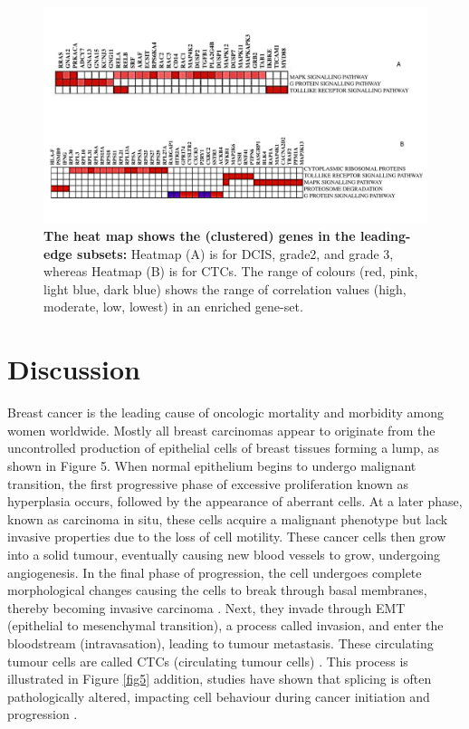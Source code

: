 \documentclass[fleqn,10pt,lineno]{wlpeerj}
\begin{document}
\begin{figure}[ht] %
\centering
\captionsetup{justification=centering}
\vspace{.5cm} %
\begin{flushright}
\includegraphics[width=150mm]{Figure4.pdf}
\caption{
\textbf{The heat map shows the (clustered) genes in the leading-edge subsets:} Heatmap (A) is for DCIS, grade2, and grade 3, whereas Heatmap (B) is for CTCs. The range of colours (red, pink, light blue, dark blue) shows the range of correlation values (high, moderate, low, lowest) in an enriched gene-set.
\label{fig4}} %
\end{flushright}
\end{figure}
\newpage
\section*{Discussion}
Breast cancer is the leading cause of oncologic mortality and morbidity among women worldwide. Mostly all breast carcinomas appear to originate from the uncontrolled production of epithelial cells of breast tissues forming a lump, as shown in Figure 5. When normal epithelium begins to undergo malignant transition, the first progressive phase of excessive proliferation known as hyperplasia occurs, followed by the appearance of aberrant cells. At a later phase, known as carcinoma in situ, these cells acquire a malignant phenotype but lack invasive properties due to the loss of cell motility. These cancer cells then grow into a solid tumour, eventually causing new blood vessels to grow, undergoing angiogenesis. In the final phase of progression, the cell undergoes complete morphological changes causing the cells to break through basal membranes, thereby becoming invasive carcinoma \citep{Allred2001}. Next, they invade through EMT (epithelial to mesenchymal transition), a process called invasion, and enter the bloodstream (intravasation), leading to tumour metastasis. These circulating tumour cells are called CTCs (circulating tumour cells) \citep{Harbeck2019}. This process is illustrated in Figure \ref{fig5} addition, studies have shown that splicing is often pathologically altered, impacting cell behaviour during cancer initiation and progression \citep{Lu2015,Chabot2016}. 
 
\end{document}
